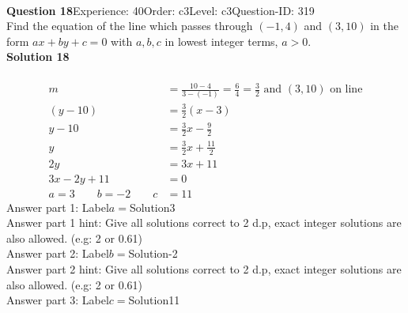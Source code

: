 \documentclass{article}
\begin{document}
\\[4pt]
\noindent\textbf{Question 18}\hspace{20pt}Experience: 40\hspace{20pt}Order: c3\hspace{20pt}Level: c3\hspace{20pt}Question-ID: 319\\[2pt]
Find the equation of the line which passes through $(-1,4)$ and $(3,10)$ in the form $ax+by+c=0$ with $a,b,c$ in lowest integer terms, $a>0$.\\[4pt]
\noindent\textbf{Solution 18}\\[2pt]
\\[-35pt]\begin{align*}
m&=\displaystyle\frac{10-4}{3-(-1)}=\displaystyle\frac{6}{4}=\displaystyle\frac{3}{2}\,\,\text{and}\,\, (3,10) \,\,\text{on line}\\[2pt]
(y-10)&=\displaystyle\frac{3}{2}(x-3)\\[2pt]
y-10&=\displaystyle\frac{3}{2}x-\displaystyle\frac{9}{2}\\[2pt]
y&=\displaystyle\frac{3}{2}x+\displaystyle\frac{11}{2}\\[2pt]
2y&=3x+11\\[2pt]
3x-2y+11&=0\\[2pt]
a=3\qquad b=-2 \qquad c&=11
\end{align*}
Answer part 1: \hspace{10pt}Label\hspace{10pt}$a=$\hspace{10pt}Solution\hspace{10pt}3\\
Answer part 1 hint: \hspace{15pt}Give all solutions correct to 2 d.p, exact integer solutions are also allowed. (e.g: 2 or 0.61)\\
Answer part 2: \hspace{10pt}Label\hspace{10pt}$b=$\hspace{10pt}Solution\hspace{10pt}-2\\
Answer part 2 hint: \hspace{15pt}Give all solutions correct to 2 d.p, exact integer solutions are also allowed. (e.g: 2 or 0.61)\\
Answer part 3: \hspace{10pt}Label\hspace{10pt}$c=$\hspace{10pt}Solution\hspace{10pt}11\\
\end{document}
